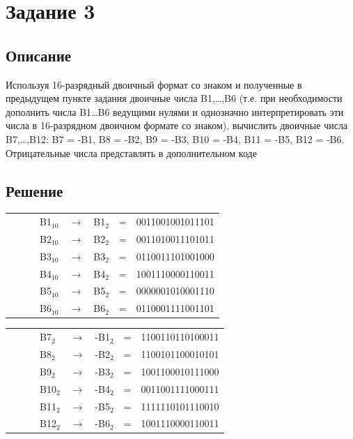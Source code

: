 \documentclass[11pt]{article}
\begin{document}
\section{Задание 3}
\label{sec:orgcbfb477}
\subsection{Описание}
\label{sec:org7f2548e}
Используя 16-разрядный двоичный формат со знаком и полученные в предыдущем пункте задания двоичные числа B1,…,B6 (т.е. при необходимости дополнить числа B1…B6 ведущими нулями и однозначно интерпретировать эти числа в 16-разрядном двоичном формате со знаком), вычислить двоичные числа B7,…,B12: B7 = -B1, B8 = -B2, B9 = -B3, B10 = -B4, B11 = -B5, B12 = -B6. Отрицательные числа представлять в дополнительном коде

\subsection{Решение}
\label{sec:org3d5c4f6}
\setlength{\tabcolsep}{3pt}
\label{tab:org68df9ab}
\begin{tabular}{llllcrcl}
 &  &  & B1\(_{\text{10}}\) & \(\to\) & B1\(_{\text{2}}\) & = & 0011001001011101\\
 &  &  & B2\(_{\text{10}}\) & \(\to\) & B2\(_{\text{2}}\) & = & 0011010011101011\\
 &  &  & B3\(_{\text{10}}\) & \(\to\) & B3\(_{\text{2}}\) & = & 0110011101001000\\
 &  &  & B4\(_{\text{10}}\) & \(\to\) & B4\(_{\text{2}}\) & = & 1001110000110011\\
 &  &  & B5\(_{\text{10}}\) & \(\to\) & B5\(_{\text{2}}\) & = & 0000001010001110\\
 &  &  & B6\(_{\text{10}}\) & \(\to\) & B6\(_{\text{2}}\) & = & 0110001111001101\\
\end{tabular}
\setlength{\tabcolsep}{3pt}
\label{tab:org972b976}
\begin{tabular}{llllcrcl}
 &  &  & B7\(_{\text{2}}\) & \(\to\) & -B1\(_{\text{2}}\) & = & 1100110110100011\\
 &  &  & B8\(_{\text{2}}\) & \(\to\) & -B2\(_{\text{2}}\) & = & 1100101100010101\\
 &  &  & B9\(_{\text{2}}\) & \(\to\) & -B3\(_{\text{2}}\) & = & 1001100010111000\\
 &  &  & B10\(_{\text{2}}\) & \(\to\) & -B4\(_{\text{2}}\) & = & 0011001111000111\\
 &  &  & B11\(_{\text{2}}\) & \(\to\) & -B5\(_{\text{2}}\) & = & 1111110101110010\\
 &  &  & B12\(_{\text{2}}\) & \(\to\) & -B6\(_{\text{2}}\) & = & 1001110000110011\\
\end{tabular}
\end{document}

